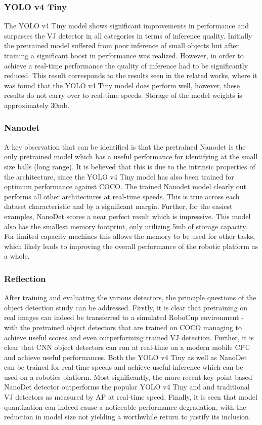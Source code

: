 \documentclass[a4paper,twoside,12pt]{report}
\begin{document}
\subsubsection{YOLO v4 Tiny}

The YOLO v4 Tiny model shows significant improvements in performance and surpasses the VJ detector in all categories in terms of inference quality. Initially the pretrained model suffered from poor inference of small objects but after training a significant boost in performance was realized. However, in order to achieve a real-time performance the quality of inference had to be significantly reduced. This result corresponds to the results seen in the related works, where it was found that the YOLO v4 Tiny model does perform well, however, these results do not carry over to real-time speeds. Storage of the model weights is approximately 30mb.

\subsubsection{Nanodet}

A key observation that can be identified is that the pretrained Nanodet is the only pretrained model which has a useful performance for identifying at the small size balls (long range). It is believed that this is due to the intrinsic properties of the architecture, since the YOLO v4 Tiny model has also been trained for optimum performance against COCO. The trained Nanodet model clearly out performs all other architectures at real-time speeds. This is true across each dataset characteristic and by a significant margin. Further, for the easiest examples, NanoDet scores a near perfect result which is impressive. This model also has the smallest memory footprint, only utilizing 5mb of storage capacity. For limited capacity machines this allows the memory to be used for other tasks, which likely leads to improving the overall performance of the robotic platform as a whole. 

\subsubsection{Reflection}

After training and evaluating the various detectors, the principle questions of the object detection study can be addressed. Firstly, it is clear that pretraining on real images can indeed be transferred to a simulated RoboCup environment - with the pretrained object detectors that are trained on COCO managing to achieve useful scores and even outperforming trained VJ detection. Further, it is clear that CNN object detectors can run at real-time on a modern mobile CPU and achieve useful performances. Both the YOLO v4 Tiny as well as NanoDet can be trained for real-time speeds and achieve useful inference which can be used on a robotics platform. Most significantly, the more recent key point based NanoDet detector outperforms the popular YOLO v4 Tiny and and traditional VJ detectors as measured by AP at real-time speed. Finally, it is seen that model quantization can indeed cause a noticeable performance degradation, with the reduction in model size not yielding a worthwhile return to justify its inclusion. 
\end{document}
